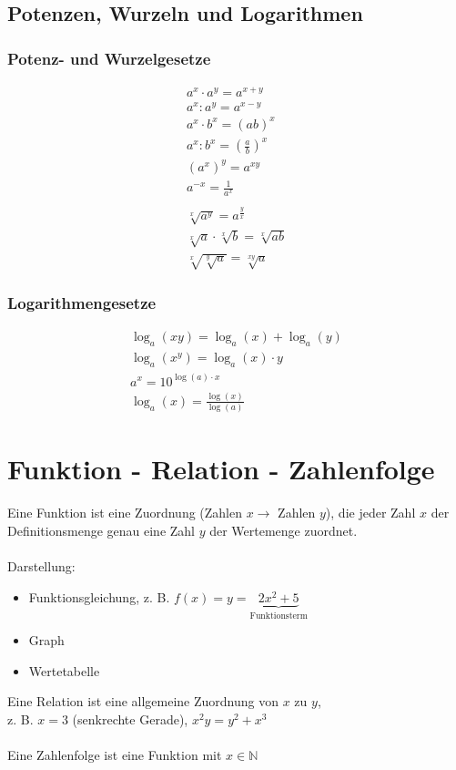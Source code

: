 \section{Potenzen, Wurzeln und Logarithmen}
\subsection{Potenz- und Wurzelgesetze}
\begin{gather*}
  a^x \cdot a^y = a^{x + y} \\
  a^x : a^y = a^{x - y} \\
  a^x \cdot b^x = (ab)^x \\
  a^x : b^x = (\frac{a}{b})^x \\
  (a^x)^y = a^{xy} \\
  a^{-x} = \frac{1}{a^x} \\\\
  \sqrt[x]{a^y} = a^\frac{y}{x} \\
  \sqrt[x]{a} \cdot \sqrt[x]{b} = \sqrt[x]{ab} \\
  \sqrt[x]{\sqrt[y]{a}} = \sqrt[xy]{a}
\end{gather*}
\subsection{Logarithmengesetze}
\begin{gather*}
  \log_a(xy) = \log_a(x) + \log_a(y) \\
  \log_a(x^y) = \log_a(x) \cdot y \\
  a^x = 10^{\log(a) \cdot x} \\
  \log_a(x) = \frac{\log(x)}{\log(a)}
\end{gather*}

\chapter{Funktion - Relation - Zahlenfolge}
Eine Funktion ist eine Zuordnung (Zahlen $x \rightarrow$ Zahlen $y$), die jeder Zahl $x$ der Definitionsmenge genau eine Zahl $y$ der Wertemenge zuordnet. \\\\
Darstellung:
\begin{itemize}
  \item Funktionsgleichung, z. B. $f(x) = y = \underbrace{2x^2 + 5}_\text{Funktionsterm}$
  \item Graph
  \item Wertetabelle
\end{itemize}
Eine Relation ist eine allgemeine Zuordnung von $x$ zu $y$,\\
z. B. $x = 3$ (senkrechte Gerade), $x^2y = y^2 + x^3$ \\\\
Eine Zahlenfolge ist eine Funktion mit $x \in \mathbb{N}$
